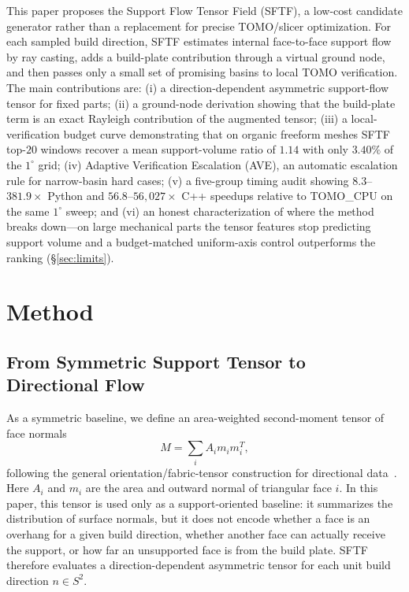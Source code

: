 \documentclass[11pt,a4paper]{article}
\begin{document}
This paper proposes the Support Flow Tensor Field (SFTF), a low-cost candidate generator rather than a replacement for precise TOMO/slicer optimization. For each sampled build direction, SFTF estimates internal face-to-face support flow by ray casting, adds a build-plate contribution through a virtual ground node, and then passes only a small set of promising basins to local TOMO verification. The main contributions are: (i) a direction-dependent asymmetric support-flow tensor for fixed parts; (ii) a ground-node derivation showing that the build-plate term is an exact Rayleigh contribution of the augmented tensor; (iii) a local-verification budget curve demonstrating that on organic freeform meshes SFTF top-$20$ windows recover a mean support-volume ratio of $1.14$ with only $3.40\%$ of the $1^\circ$ grid; (iv) Adaptive Verification Escalation (AVE), an automatic escalation rule for narrow-basin hard cases; (v) a five-group timing audit showing $8.3$--$381.9\times$ Python and $56.8$--$56{,}027\times$ C++ speedups relative to TOMO\_CPU on the same $1^\circ$ sweep; and (vi) an honest characterization of where the method breaks down---on large mechanical parts the tensor features stop predicting support volume and a budget-matched uniform-axis control outperforms the ranking (\S\ref{sec:limits}).


\section{Method}

\subsection{From Symmetric Support Tensor to Directional Flow}
\label{sec:support-tensor-limit}
\label{sec:sftf}

As a symmetric baseline, we define an area-weighted second-moment tensor of face normals
\begin{equation}
M=\sum_i A_i m_i m_i^T,
\end{equation}
following the general orientation/fabric-tensor construction for directional data~\cite{kanatani1984}.
Here $A_i$ and $m_i$ are the area and outward normal of triangular face $i$.
In this paper, this tensor is used only as a support-oriented baseline: it summarizes the distribution of surface normals, but it does not encode whether a face is an overhang for a given build direction, whether another face can actually receive the support, or how far an unsupported face is from the build plate.
SFTF therefore evaluates a direction-dependent asymmetric tensor for each unit build direction $n\in S^2$.
\end{document}
